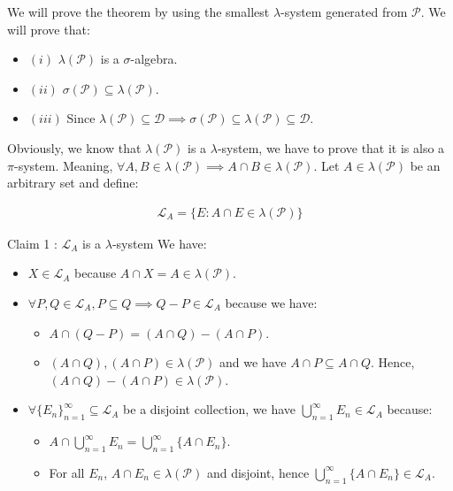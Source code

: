 \begin{proof*}
    We will prove the theorem by using the smallest $\lambda$-system generated from $\mathcal{P}$. We will prove that:
    \begin{itemize}
        \item $(i)$ $\lambda(\mathcal{P})$ is a $\sigma$-algebra.
        \item $(ii)$ $\sigma(\mathcal{P}) \subseteq \lambda(\mathcal{P})$.
        \item $(iii)$ Since $\lambda(\mathcal{P})\subseteq \mathcal{D} \implies \sigma(\mathcal{P}) \subseteq \lambda(\mathcal{P})\subseteq\mathcal{D}$.
    \end{itemize}

    \noindent Obviously, we know that $\lambda(\mathcal{P})$ is a $\lambda$-system, we have to prove that it is also a $\pi$-system. Meaning, $\forall A, B \in \lambda(\mathcal{P})\implies A\cap B \in \lambda(\mathcal{P})$. Let $A \in \lambda(\mathcal{P})$ be an arbitrary set and define:

    \begin{align*}
        \mathcal{L}_A = \Big\{ E : A\cap E \in \lambda(\mathcal{P}) \Big\}     
    \end{align*}

    \begin{subproof}{Claim 1 : $\mathcal{L}_A$ is a $\lambda$-system}
        We have:
        \begin{itemize}
    	\item $X\in \mathcal{L}_A$ because $A\cap X = A \in \lambda(\mathcal{P})$.
    	\item $\forall P, Q \in \mathcal{L}_A, P\subseteq Q \implies Q-P\in\mathcal{L}_A$ because we have:
        	\begin{itemize}
        	    \item $A\cap(Q-P) = (A\cap Q) - (A\cap P)$.
    		  \item $(A\cap Q), (A \cap P) \in \lambda(\mathcal{P})$  and we have $A\cap P \subseteq A\cap Q$. Hence, $(A\cap Q) - (A\cap P)\in\lambda(\mathcal{P})$.
            \end{itemize}
    	\item  $\forall \{E_n\}_{n=1}^\infty \subseteq \mathcal{L}_A$ be a disjoint collection, we have $\bigcup_{n=1}^\infty E_n \in \mathcal{L}_A$ because:
            \begin{itemize}
                \item $A\cap\bigcup_{n=1}^\infty E_n=\bigcup_{n=1}^\infty\{A\cap E_n\}$.
                \item For all $E_n$, $A\cap E_n \in \lambda(\mathcal{P})$ and disjoint, hence $\bigcup_{n=1}^\infty \{A\cap E_n\} \in \mathcal{L}_A$.\newline
            \end{itemize}
        \end{itemize}
    \end{subproof}



\end{proof*}
